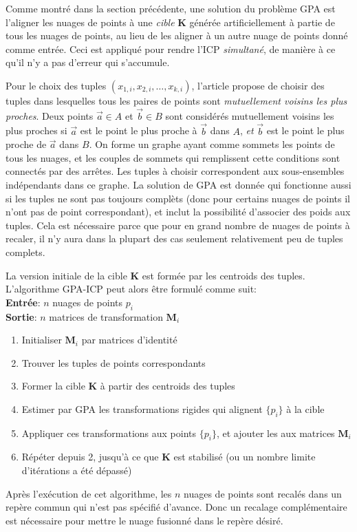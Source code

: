 \documentclass[a4paper,10pt]{scrreprt}
\begin{document}
Comme montré dans la section précédente, une solution du problème GPA est l'aligner les nuages de points à une \emph{cible} $\mathbf{K}$ générée artificiellement à partie de tous les nuages de points, au lieu de les aligner à un autre nuage de points donné comme entrée. Ceci est appliqué pour rendre l'ICP \emph{simultané}, de manière à ce qu'il n'y a pas d'erreur qui s'accumule.

Pour le choix des tuples ${(x_{1,i}, x_{2,i}, \ldots, x_{k,i})}$, l'article propose de choisir des tuples dans lesquelles tous les paires de points sont \emph{mutuellement voisins les plus proches}. Deux points $\vec{a} \in A$ et $\vec{b} \in B$ sont considérés mutuellement voisins les plus proches si $\vec{a}$ est le point le plus proche à $\vec{b}$ dans $A$, \emph{et} $\vec{b}$ est le point le plus proche de $\vec{a}$ dans $B$. On forme un graphe ayant comme sommets les points de tous les nuages, et les couples de sommets qui remplissent cette conditions sont connectés par des arrêtes. Les tuples à choisir correspondent aux sous-ensembles indépendants dans ce graphe. La solution de GPA est donnée qui fonctionne aussi si les tuples ne sont pas toujours complèts (donc pour certains nuages de points il n'ont pas de point correspondant), et inclut la possibilité d'associer des poids aux tuples. Cela est nécessaire parce que pour en grand nombre de nuages de points à recaler, il n'y aura dans la plupart des cas seulement relativement peu de tuples complets.

La version initiale de la cible $\mathbf{K}$ est formée par les centroids des tuples. L'algorithme GPA-ICP peut alors être formulé comme suit: \cite{Told2010} \\
\textbf{Entrée}: $n$ nuages de points ${p_i}$ \\
\textbf{Sortie}: $n$ matrices de transformation ${\mathbf{M}_i}$
\begin{enumerate}
	\item Initialiser ${\mathbf{M}_i}$ par matrices d'identité
	\item Trouver les tuples de points correspondants
	\item Former la cible $\mathbf{K}$ à partir des centroids des tuples
	\item Estimer par GPA les transformations rigides qui alignent $\{p_i\}$ à la cible
	\item Appliquer ces transformations aux points $\{p_i\}$, et ajouter les aux matrices ${\mathbf{M}_i}$
	\item Répéter depuis 2, jusqu'à ce que $\mathbf{K}$ est stabilisé (ou un nombre limite d'itérations a été dépassé)
\end{enumerate} 
Après l'exécution de cet algorithme, les $n$ nuages de points sont recalés dans un repère commun qui n'est pas spécifié d'avance. Donc un recalage complémentaire est nécessaire pour mettre le nuage fusionné dans le repère désiré.
\end{document}
